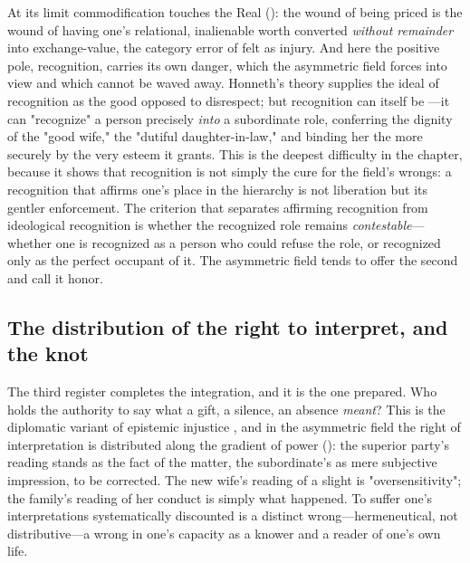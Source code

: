 At its limit commodification touches the Real (): the wound of being priced is the wound of having one's relational, inalienable worth converted \emph{without remainder} into exchange-value, the category error of  felt as injury. And here the positive pole, recognition, carries its own danger, which the asymmetric field forces into view and which cannot be waved away. Honneth's theory \parencite{honneth1992} supplies the ideal of recognition as the good opposed to disrespect; but recognition can itself be ---it can "recognize" a person precisely \emph{into} a subordinate role, conferring the dignity of the "good wife," the "dutiful daughter-in-law," and binding her the more securely by the very esteem it grants. This is the deepest difficulty in the chapter, because it shows that recognition is not simply the cure for the field's wrongs: a recognition that affirms one's place in the hierarchy is not liberation but its gentler enforcement. The criterion that separates affirming recognition from ideological recognition is whether the recognized role remains \emph{contestable}---whether one is recognized as a person who could refuse the role, or recognized only as the perfect occupant of it. The asymmetric field tends to offer the second and call it honor.

\subsection{The distribution of the right to interpret, and the knot}
The third register completes the integration, and it is the one  prepared. Who holds the authority to say what a gift, a silence, an absence \emph{meant}? This is the diplomatic variant of epistemic injustice \parencite{fricker2007}, and in the asymmetric field the right of interpretation is distributed along the gradient of power (): the superior party's reading stands as the fact of the matter, the subordinate's as mere subjective impression, to be corrected. The new wife's reading of a slight is "oversensitivity"; the family's reading of her conduct is simply what happened. To suffer one's interpretations systematically discounted is a distinct wrong---hermeneutical, not distributive---a wrong in one's capacity as a knower and a reader of one's own life.

